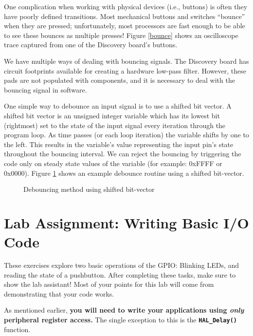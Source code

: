 \documentclass[openany,11pt,fleqn]{book} %
\newcommand{\code}[3]{
    \begin{figure}[]
        \begin{center}
            \hspace*{-3.4cm}
            \colorbox{gray!20!white}{
                \parbox{0.8\paperwidth} {
                    
                }
            }
            \caption{#2}
            \label{#3}
        \end{center}
    \end{figure}
}
\begin{document}
One complication when working with physical devices (i.e., buttons) is often they have poorly defined transitions. Most mechanical buttons and switches ``bounce'' when they are pressed; unfortunately, most processors are fast enough to be able to see these bounces as multiple presses! Figure \ref{bounce} shows an oscilloscope trace captured from one of the Discovery board's buttons.

We have multiple ways of dealing with bouncing signals. The Discovery board has circuit footprints available for creating a hardware low-pass filter. However, these pads are not populated with components, and it is necessary to deal with the bouncing signal in software.

One simple way to debounce an input signal is to use a shifted bit vector. A shifted bit vector is an unsigned integer variable which has its lowest bit (rightmost) set to the state of the input signal every iteration through the program loop. As time passes (or each loop iteration) the variable shifts by one to the left. This results in the variable's value representing the input pin's state throughout the bouncing interval. We can reject the bouncing by triggering the code only on steady state values of the variable (for example: 0xFFFF or 0x0000). Figure \ref{debounce} shows an example debounce routine using a shifted bit-vector.

\code{./files/debounce.c}{Debouncing method using shifted bit-vector}{debounce}

\section{\color{blue}Lab Assignment: Writing Basic I/O Code}

These exercises explore two basic operations of the GPIO: Blinking LEDs, and reading the state of a pushbutton.
After completing these tasks, make sure to show the lab assistant! Most of your points for this lab will come from demonstrating that your code works. 
\begin{warning}
As mentioned earlier, \textbf{you will need to write your applications using \textit{only} peripheral register access.} The single exception to this is the \texttt{\textbf{HAL\_Delay()}} function.
\end{warning}
\end{document}
